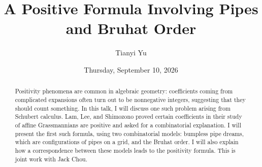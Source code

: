 \documentclass{UAmathtalk}
\author{Tianyi Yu}
\title{A Positive Formula Involving Pipes and Bruhat Order}
\date{Thursday, September 10, 2026}
\begin{document}
\maketitle

\begin{abstract}
Positivity phenomena are common in algebraic geometry: coefficients coming from complicated expansions often turn out to be nonnegative integers, suggesting that they should count something. In this talk, I will discuss one such problem arising from Schubert calculus. Lam, Lee, and Shimozono proved certain coefficients in their study of affine Grassmannians are positive and asked for a combinatorial explanation. I will present the first such formula, using two combinatorial models: bumpless pipe dreams, which are configurations of pipes on a grid, and the Bruhat order. I will also explain how a correspondence between these models leads to the positivity formula. This is joint work with Jack Chou.
\end{abstract}
\end{document}
